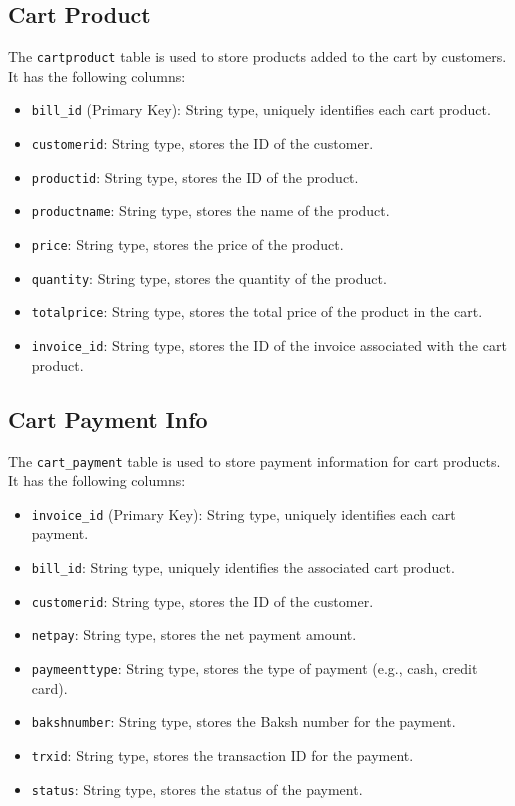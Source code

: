 \subsection{Cart Product}

The \texttt{cartproduct} table is used to store products added to the cart by customers. It has the following columns:

\begin{itemize}
    \item \texttt{bill\_id} (Primary Key): String type, uniquely identifies each cart product.
    \item \texttt{customerid}: String type, stores the ID of the customer.
    \item \texttt{productid}: String type, stores the ID of the product.
    \item \texttt{productname}: String type, stores the name of the product.
    \item \texttt{price}: String type, stores the price of the product.
    \item \texttt{quantity}: String type, stores the quantity of the product.
    \item \texttt{totalprice}: String type, stores the total price of the product in the cart.
    \item \texttt{invoice\_id}: String type, stores the ID of the invoice associated with the cart product.
\end{itemize}

\subsection{Cart Payment Info}

The \texttt{cart\_payment} table is used to store payment information for cart products. It has the following columns:

\begin{itemize}
    \item \texttt{invoice\_id} (Primary Key): String type, uniquely identifies each cart payment.
    \item \texttt{bill\_id}: String type, uniquely identifies the associated cart product.
    \item \texttt{customerid}: String type, stores the ID of the customer.
    \item \texttt{netpay}: String type, stores the net payment amount.
    \item \texttt{paymeenttype}: String type, stores the type of payment (e.g., cash, credit card).
    \item \texttt{bakshnumber}: String type, stores the Baksh number for the payment.
    \item \texttt{trxid}: String type, stores the transaction ID for the payment.
    \item \texttt{status}: String type, stores the status of the payment.
\end{itemize}

